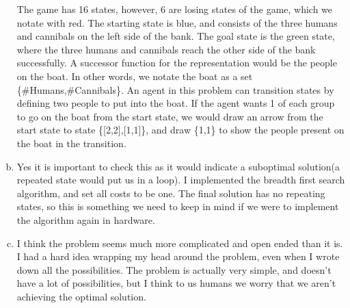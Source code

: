 \documentclass[12pt]{amsart}
\begin{document}
\begin{enumerate}[a)]
\begin{tabular}{ |p{1cm}||p{1cm}|p{1cm}| p{1cm}|  }
\end{tabular}

The game has 16 states, however, 6 are losing states of the game, which we notate with red. The starting state is blue, and consists of the three humans and cannibals on the left side of the bank. The goal state is the green state, where the three humans and cannibals reach the other side of the bank successfully. A successor function for the representation would be the people on the boat. In other words, we notate the boat as a set \{\#Humans,\#Cannibals\}. An agent in this problem can transition states by defining two people to put into the boat. If the agent wants 1 of each group to go on the boat from the start state, we would draw an arrow from the start state to state \{[2,2],[1,1]\}, and draw \{1,1\} to show the people present on the boat in the transition.
\hfill \break

    \item Yes it is important to check this as it would indicate a suboptimal solution(a repeated state would put us in a loop). I implemented the breadth first search algorithm, and set all costs to be one. The final solution has no repeating states, so this is something we need to keep in mind if we were to implement the algorithm again in hardware.

       \item  I think the problem seems much more complicated and open ended than it is. I had a hard idea wrapping my head around the problem, even when I wrote down all the possibilities. The problem is actually very simple, and doesn't have a lot of possibilities, but I think to us humans we worry that we aren't achieving the optimal solution.
       
\end{enumerate} \hfill \break
\end{document}
